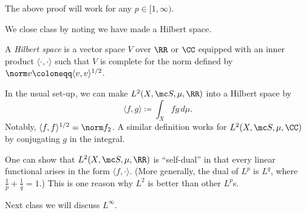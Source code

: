 \documentclass[../notes.tex]{subfiles}
\begin{document}
\begin{remark}
	The above proof will work for any $p\in[1,\infty)$.
\end{remark}
We close class by noting we have made a Hilbert space.
\begin{definition}
	A \textit{Hilbert space} is a vector space $V$ over $\RR$ or $\CC$ equipped with an inner product $\langle\cdot,\cdot\rangle$ such that $V$ is complete for the norm defined by $\norm v\coloneqq\langle v,v\rangle^{1/2}$.
\end{definition}
\begin{example}
	In the usual set-up, we can make $L^2(X,\mc S,\mu,\RR)$ into a Hilbert space by
	\[\langle f,g\rangle\coloneqq\int_Xfg\,d\mu.\]
	Notably, $\langle f,f\rangle^{1/2}=\norm f_2$. A similar definition works for $L^2(X,\mc S,\mu,\CC)$ by conjugating $g$ in the integral.
\end{example}
\begin{remark}
	One can show that $L^2(X,\mc S,\mu,\RR)$ is ``self-dual'' in that every linear functional arises in the form $\langle f,\cdot\rangle$. (More generally, the dual of $L^p$ is $L^q$, where $\frac1p+\frac1q=1$.) This is one reason why $L^2$ is better than other $L^p$s.
\end{remark}
Next class we will discuss $L^\infty$.
\end{document}
